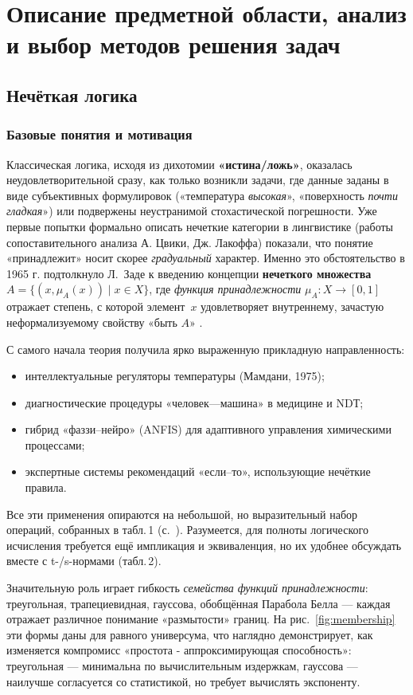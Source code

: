 \section{Описание предметной области, анализ и выбор методов решения задач}

\subsection{Нечёткая логика}
\subsubsection{Базовые понятия и мотивация}
Классическая логика, исходя из дихотомии \textbf{«истина/ложь»},
оказалась неудовлетворительной сразу, как только возникли задачи,
где данные заданы в виде субъективных формулировок
(«температура \emph{высокая}», «поверхность \emph{почти гладкая}»)  
или подвержены неустранимой стохастической погрешности.
Уже первые попытки формально описать нечеткие категории
в лингвистике (работы сопоставительного анализа А. Цвики,
Дж. Лакоффа) показали, что понятие «принадлежит» носит скорее
\emph{градуальный} характер.  
Именно это обстоятельство в 1965 г. подтолкнуло Л.~Заде к введению
концепции \textbf{нечеткого множества}
$A=\{(x,\mu_A(x))\mid x\!\in\!X\}$, 
где \emph{функция принадлежности} $\mu_A\colon X\!\to\![0,1]$
отражает степень, с которой элемент~$x$ удовлетворяет
внутреннему, зачастую неформализуемому свойству «быть $A$»  
\cite{zadeh1965}.  

С самого начала теория получила ярко выраженную
прикладную направленность:
\begin{itemize}
  \item интеллектуальные регуляторы температуры (Мамдани, 1975);
  \item диагностические процедуры «человек—машина» в медицине
        и NDТ;
  \item гибрид «фаззи–нейро» (ANFIS) для адаптивного
        управления химическими процессами;
  \item экспертные системы рекомендаций «если–то»,
        использующие нечёткие правила.
\end{itemize}
Все эти применения опираются на небольшой, но выразительный набор
операций, собранных в табл.\,1 (с.~\pageref{tab:operations}).  
Разумеется, для полноты логического исчисления требуется
ещё импликация и эквиваленция, но их удобнее обсуждать вместе  
с t-/s-нормами (табл.\,2).  

Значительную роль играет гибкость \emph{семейства функций
принадлежности}: треугольная, трапециевидная, гауссова,
обобщённая Парабола Белла — каждая отражает
различное понимание «размытости» границ.
На рис.~\ref{fig:membership} эти формы даны
для равного универсума, что наглядно демонстрирует,
как изменяется компромисс «простота - аппроксимирующая
способность»:
треугольная — минимальна по вычислительным издержкам,
гауссова — наилучше согласуется со статистикой,
но требует вычислять экспоненту.


